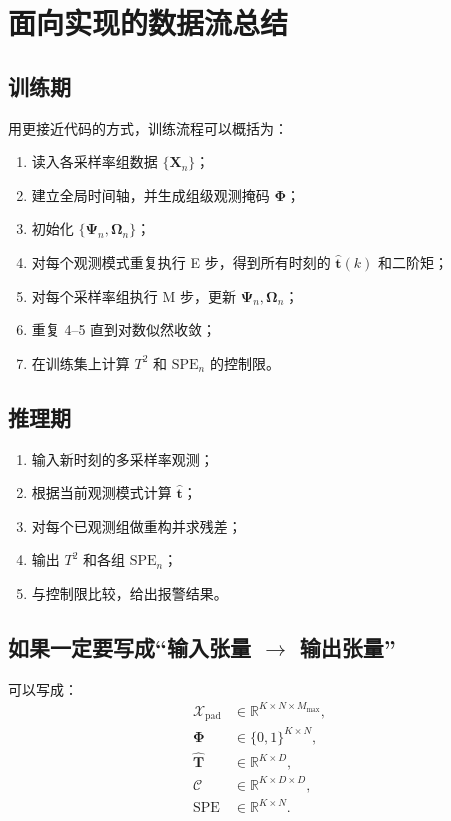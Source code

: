 \documentclass[UTF8]{ctexart}
\begin{document}
\section{面向实现的数据流总结}

\subsection{训练期}

用更接近代码的方式，训练流程可以概括为：
\begin{enumerate}
    \item 读入各采样率组数据 $\{\bm{X}_n\}$；
    \item 建立全局时间轴，并生成组级观测掩码 $\bm{\Phi}$；
    \item 初始化 $\{\bm{\Psi}_n,\bm{\Omega}_n\}$；
    \item 对每个观测模式重复执行 E 步，得到所有时刻的 $\hat{\bm{t}}(k)$ 和二阶矩；
    \item 对每个采样率组执行 M 步，更新 $\bm{\Psi}_n,\bm{\Omega}_n$；
    \item 重复 4--5 直到对数似然收敛；
    \item 在训练集上计算 $T^2$ 和 $\mathrm{SPE}_n$ 的控制限。
\end{enumerate}

\subsection{推理期}

\begin{enumerate}
    \item 输入新时刻的多采样率观测；
    \item 根据当前观测模式计算 $\hat{\bm{t}}$；
    \item 对每个已观测组做重构并求残差；
    \item 输出 $T^2$ 和各组 $\mathrm{SPE}_n$；
    \item 与控制限比较，给出报警结果。
\end{enumerate}

\subsection{如果一定要写成“输入张量 $\rightarrow$ 输出张量”}

可以写成：
\begin{align}
    \mathcal{X}_{\mathrm{pad}} &\in \mathbb{R}^{K \times N \times M_{\max}}, \\
    \bm{\Phi} &\in \{0,1\}^{K \times N}, \\
    \hat{\bm{T}} &\in \mathbb{R}^{K \times D}, \\
    \mathcal{C} &\in \mathbb{R}^{K \times D \times D}, \\
    \mathrm{SPE} &\in \mathbb{R}^{K \times N}.
\end{align}
\end{document}
